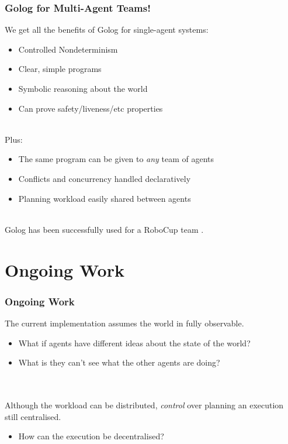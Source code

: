 \documentclass{beamer}
\begin{document}
\begin{frame}
\frametitle{Golog for Multi-Agent Teams!}
We get all the benefits of Golog for single-agent systems:
\begin{itemize}
  \item Controlled Nondeterminism
  \item Clear, simple programs
  \item Symbolic reasoning about the world
  \item Can prove safety/liveness/etc properties
\end{itemize}
\ \\
\pause
Plus:
\begin{itemize}
  \item The same program can be given to \emph{any} team of agents
  \item Conflicts and concurrency handled declaratively
  \item Planning workload easily shared between agents
\end{itemize}
\ \\
\pause
Golog has been successfully used for a RoboCup team \cite{Ferrein2005readylog}.
\end{frame}


\section{Ongoing Work}

\begin{frame}
\frametitle{Ongoing Work}

The current implementation assumes the world in fully observable.
\begin{itemize}
  \item What if agents have different ideas about the state of the world?
  \item What is they can't see what the other agents are doing?
\end{itemize}
\ \\
\ \\
Although the workload can be distributed, \emph{control} over planning 
an execution still centralised.

\begin{itemize}
  \item How can the execution be decentralised?
\end{itemize}
\end{frame}
\end{document}
